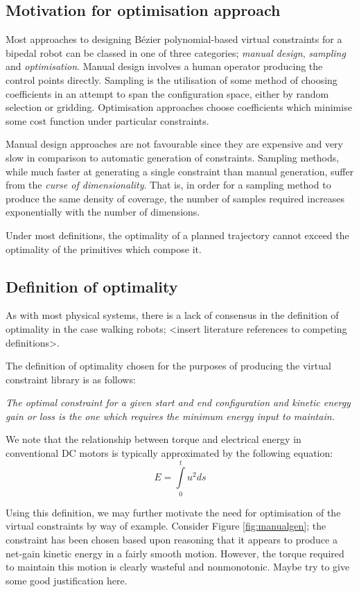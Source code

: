 \subsection{Motivation for optimisation approach}
Most approaches to designing Bézier polynomial-based virtual constraints for a bipedal robot can be classed in one of three categories; \textit{manual design}, \textit{sampling} and \textit{optimisation}. Manual design involves a human operator producing the control points directly. Sampling is the utilisation of some method of choosing coefficients in an attempt to span the configuration space, either by random selection or gridding. Optimisation approaches choose coefficients which minimise some cost function under particular constraints.

Manual design approaches are not favourable since they are expensive and very slow in comparison to automatic generation of constraints. Sampling methods, while much faster at generating a single constraint than manual generation, suffer from the \textit{curse of dimensionality}. That is, in order for a sampling method to produce the same density of coverage, the number of samples required increases exponentially with the number of dimensions.

Under most definitions, the optimality of a planned trajectory cannot exceed the optimality of the primitives which compose it.

\subsection{Definition of optimality}
As with most physical systems, there is a lack of consensus in the definition of optimality in the case walking robots; {\color{red}<insert literature references to competing definitions>}.

The definition of optimality chosen for the purposes of producing the virtual constraint library is as follows:

\emph{The optimal constraint for a given start and end configuration and kinetic energy gain or loss is the one which requires the minimum energy input to maintain.}

We note that the relationship between torque and electrical energy in conventional DC motors is typically approximated by the following equation: \cite{??}
\begin{equation}
	E = \int\limits_0^t u^2 ds
\end{equation}

Using this definition, we may further motivate the need for optimisation of the virtual constraints by way of example. Consider Figure \ref{fig:manualgen}; the constraint has been chosen based upon reasoning that it appears to produce a net-gain kinetic energy in a fairly smooth motion. However, the torque required to maintain this motion is clearly wasteful and nonmonotonic. {\color{red} Maybe try to give some good justification here.}

